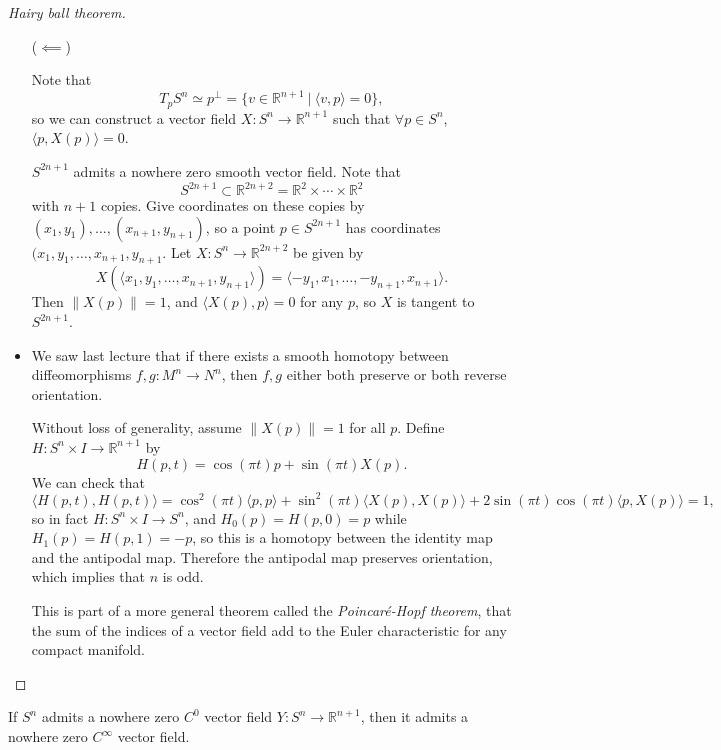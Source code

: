 \begin{proof}[Hairy ball theorem]
\begin{itemize}
  \item[($\impliedby$)]{

    Note that
    $$
           T_p S^n
    \simeq p^\perp
    =      \{ v \in \mathbb{R}^{n+1}  ~\vert~ \langle v, p \rangle = 0 \},
    $$
    so we can construct a vector field $X: S^n \to \mathbb{R}^{n+1}$
    such that $\forall p \in S^n$, $\langle p, X(p) \rangle = 0$.

    $S^{2n+1}$ admits a nowhere zero smooth vector field. Note that
    $$
            S^{2n + 1}
    \subset \mathbb{R}^{2n + 2}
    = \mathbb{R}^2 \times \cdots \times \mathbb{R}^2
    $$
    with $n + 1$ copies. Give coordinates on these
    copies by $(x_1, y_1), \dots, (x_{n+1}, y_{n+1})$, so a point
    $p \in S^{2n + 1}$ has coordinates
    $(x_1, y_1, \dots, x_{n+1}, y_{n+1}$. Let
    $X: S^n \to \mathbb{R}^{2n + 2}$
    be given by
    $$
      X(\langle x_1, y_1, \dots, x_{n+1}, y_{n+1}\rangle)
    = \langle -y_1, x_1, \dots, -y_{n+1}, x_{n+1} \rangle.
    $$
    Then $\| X(p) \| = 1$, and $\langle X(p), p \rangle = 0$ for any $p$,
    so $X$ is tangent to $S^{2n + 1}$.
  }
  \item{
    We saw last lecture that if there exists a smooth homotopy between
    diffeomorphisms $f, g: M^n \to N^n$, then $f, g$ either both
    preserve or both reverse orientation.

    Without loss of generality, assume $\| X(p) \| = 1$ for all $p$.
    Define $H: S^n \times I \to \mathbb{R}^{n+1}$ by
    $$
      H(p, t)
    = \cos(\pi t)p + \sin(\pi t) X(p).
    $$
    We can check that
    $$
      \langle H(p,t), H(p,t) \rangle
    = \cos^2 (\pi t) \langle p, p \rangle
    + \sin^2 (\pi t) \langle X(p), X(p) \rangle
    + 2 \sin (\pi t) \cos (\pi t) \langle p, X(p) \rangle
    = 1,
    $$
    so in fact $H : S^n \times I \to S^n$, and
    $H_0(p) = H(p, 0) = p$ while $H_1(p) = H(p, 1) = -p$, so this is a
    homotopy between the identity map and the antipodal map. Therefore
    the antipodal map preserves orientation, which implies that $n$ is
    odd.

    This is part of a more general theorem called the
    \emph{Poincar\'e-Hopf theorem}, that the sum of the indices of a
    vector field add to the Euler characteristic for any compact manifold.
  }
\end{itemize}
\end{proof}

\begin{prop}
If $S^n$ admits a nowhere zero $C^0$ vector field $Y: S^n \to
\mathbb{R}^{n+1}$, then it admits a nowhere zero $C^\infty$ vector
field.
\end{prop}

